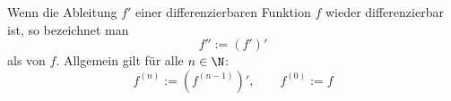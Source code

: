 Wenn die Ableitung $f'$ einer differenzierbaren Funktion $f$ wieder differenzierbar ist, so bezeichnet man
$$f'' := (f')'$$
als  von $f$. Allgemein gilt für alle $n \in \N$:
$$f^{(n)} := (f^{(n-1)})', \qquad f^{(0)} := f$$